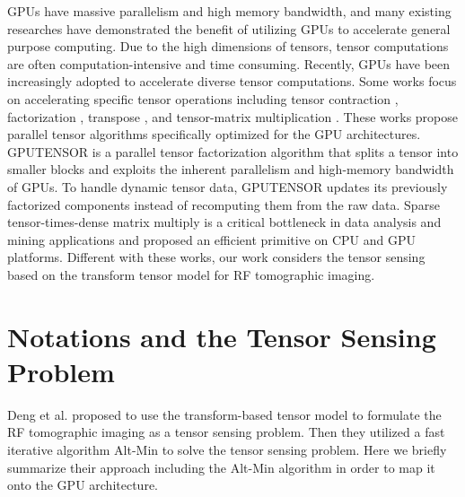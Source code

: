 \documentclass[futureinternet,article,submit,moreauthors,pdftex,10pt,a4paper]{Definitions/mdpi}
\theoremstyle{plain}
\theoremstyle{definition}
\theoremstyle{remark}
\begin{document}
GPUs have massive parallelism and high memory bandwidth, and many existing researches \cite{jing2016energy} \cite{zhang2015buddy} \cite{zhang2015efficient} \cite{zhang2014cuirre} \cite{zhang2016efficient} have demonstrated the benefit of utilizing GPUs to accelerate general purpose computing. Due to the high dimensions of tensors, tensor computations are often computation-intensive and time consuming. Recently, GPUs have been increasingly adopted to accelerate diverse tensor computations. Some works focus on accelerating specific tensor operations including tensor contraction \cite{nelson2015generating} \cite{shi2016tensor}, factorization \cite{antikainen2011nonnegative}, transpose \cite{lyakh2015an} \cite{hynninen2017cutt}, and tensor-matrix multiplication \cite{rogers2016efficient}. These works propose parallel tensor algorithms specifically optimized for the GPU architectures. GPUTENSOR \cite{zou2015gputensor} is a parallel tensor factorization algorithm that splits a tensor into smaller blocks and exploits the inherent parallelism and high-memory bandwidth of GPUs. To handle dynamic tensor data, GPUTENSOR updates its previously factorized components instead of recomputing them from the raw data. Sparse tensor-times-dense matrix multiply is a critical bottleneck in data analysis and mining applications and \cite{li2016optimizing} proposed an efficient primitive on CPU and GPU platforms. Different with these works, our work considers the tensor sensing based on the transform tensor model for RF tomographic imaging.

\section{Notations and the Tensor Sensing Problem}
\label{SEC_ALGORITHM}
Deng et al. \cite{deng2018tensor} proposed to use the transform-based tensor model to formulate the RF tomographic imaging as a tensor sensing problem. Then they utilized a fast iterative algorithm Alt-Min to solve the tensor sensing problem. Here we briefly summarize their approach including the Alt-Min algorithm in order to map it onto the GPU architecture.
\end{document}
